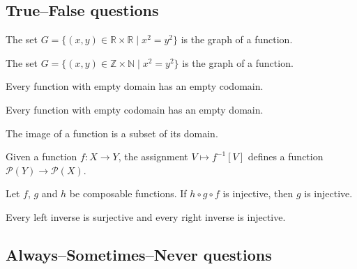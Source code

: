 \subsection*{True--False questions}


\begin{chapex} %
\label{cqFunctionsTFBegin}
The set $G = \{ (x,y) \in \mathbb{R} \times \mathbb{R} \mid x^2=y^2 \}$ is the graph of a function.
\end{chapex}

\begin{chapex} %
The set $G = \{ (x,y) \in \mathbb{Z}\times \mathbb{N} \mid x^2=y^2 \}$ is the graph of a function.
\end{chapex}

\begin{chapex} %
Every function with empty domain has an empty codomain.
\end{chapex}

\begin{chapex} %
Every function with empty codomain has an empty domain.
\end{chapex}

\begin{chapex} %
The image of a function is a subset of its domain.
\end{chapex}

\begin{chapex} %
Given a function $f : X \to Y$, the assignment $V \mapsto f^{-1}[V]$ defines a function $\mathcal{P}(Y) \to \mathcal{P}(X)$.
\end{chapex}

\begin{chapex} %
Let $f$, $g$ and $h$ be composable functions. If $h \circ g \circ f$ is injective, then $g$ is injective.
\end{chapex}

\begin{chapex} %
\label{cqFunctionsTFEnd}
Every left inverse is surjective and every right inverse is injective.
\end{chapex}

\subsection*{Always--Sometimes--Never questions}



